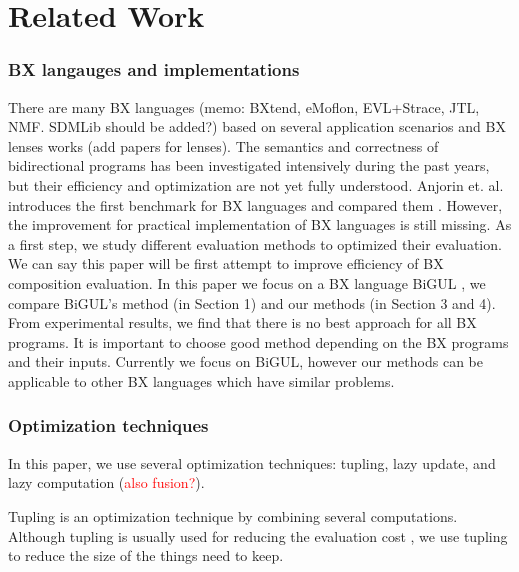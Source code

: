 \section{Related Work}

\subsubsection*{BX langauges and implementations}

There are many BX languages \cite{josh_pepm} \cite{BXtend} \cite{eMoflon} \cite{EVL+Strace} \cite{JTL} \cite{NMF} (memo: BXtend, eMoflon, EVL+Strace, JTL, NMF. SDMLib should be added?) based on several application scenarios and BX lenses works \cite{} (add papers for lenses). The semantics and correctness of bidirectional programs has been investigated intensively during the past years, but their efficiency and optimization are not yet fully understood. Anjorin et. al. introduces the first benchmark for BX languages and compared them \cite{BXcomp}. However, the improvement for practical implementation of BX languages is still missing. As a first step, we study different evaluation methods to optimized their evaluation. We can say this paper will be first attempt to improve efficiency of BX composition evaluation. In this paper we focus on a BX language BiGUL \cite{josh_pepm} \cite{josh_popl}, we compare BiGUL's method (in Section 1) and our methods (in Section 3 and 4). From experimental results, we find that there is no best approach for all BX programs. It is important to choose good method depending on the BX programs and their inputs. Currently we focus on BiGUL, however our methods can be applicable to other BX languages which have similar problems.

\subsubsection*{Optimization techniques}

In this paper, we use several optimization techniques: tupling, lazy update, and lazy computation (\textcolor{red}{also fusion?}).

Tupling \cite{tupling} is an optimization technique by combining several computations. Although tupling is usually used for reducing the evaluation cost\cite{} \cite{}, we use tupling to reduce the size of the things need to keep.

